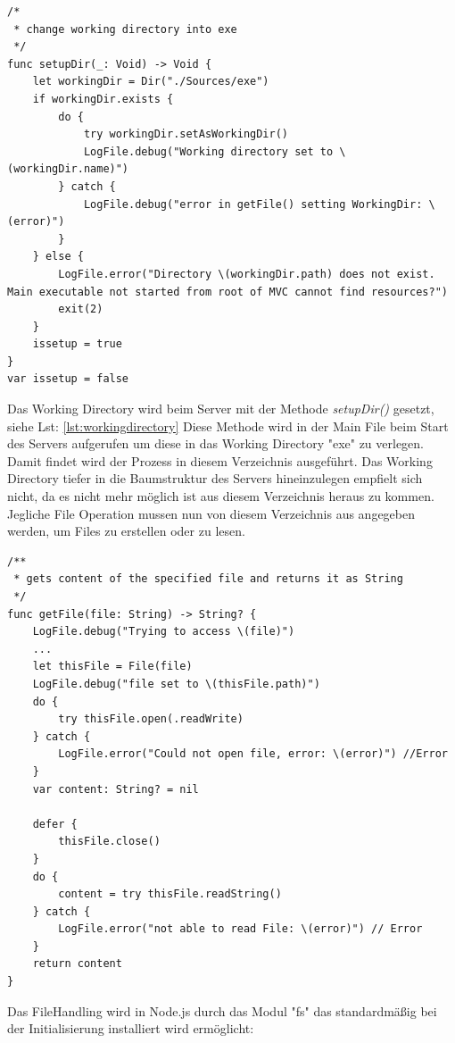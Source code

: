 \begin{lstlisting}
/*
 * change working directory into exe
 */
func setupDir(_: Void) -> Void {
    let workingDir = Dir("./Sources/exe")
    if workingDir.exists {
        do {
            try workingDir.setAsWorkingDir()
            LogFile.debug("Working directory set to \(workingDir.name)")
        } catch {
            LogFile.debug("error in getFile() setting WorkingDir: \(error)")
        }
    } else {
        LogFile.error("Directory \(workingDir.path) does not exist. Main executable not started from root of MVC cannot find resources?")
        exit(2)
    }
    issetup = true
}
var issetup = false
\end{lstlisting}

Das Working Directory wird beim Server mit der Methode \textit{setupDir()} gesetzt, siehe Lst: \ref{lst:workingdirectory} Diese Methode wird in der Main File beim Start des Servers aufgerufen um diese in das Working Directory "exe" zu verlegen. Damit findet wird der Prozess in diesem Verzeichnis ausgeführt. Das Working Directory tiefer in die Baumstruktur des Servers hineinzulegen empfielt sich nicht, da es nicht mehr möglich ist aus diesem Verzeichnis heraus zu kommen. Jegliche File Operation mussen nun von diesem Verzeichnis aus angegeben werden, um Files zu erstellen oder zu lesen. 


\begin{lstlisting}
/**
 * gets content of the specified file and returns it as String
 */
func getFile(file: String) -> String? {
    LogFile.debug("Trying to access \(file)")
    ...
    let thisFile = File(file)
    LogFile.debug("file set to \(thisFile.path)")
    do {
        try thisFile.open(.readWrite)
    } catch {
        LogFile.error("Could not open file, error: \(error)") //Error
    }
    var content: String? = nil

    defer {
        thisFile.close()
    }
    do {
        content = try thisFile.readString()
    } catch {
        LogFile.error("not able to read File: \(error)") // Error
    }
    return content
}
\end{lstlisting}

Das FileHandling wird in Node.js durch das Modul "fs" das standardmäßig bei der Initialisierung installiert wird ermöglicht:

